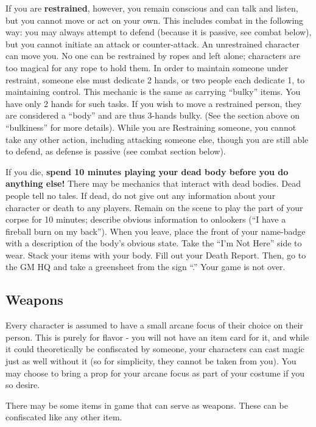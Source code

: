 \documentclass[sheet]{GL2020}
\begin{document}
If you are \textbf{restrained}, however, you remain conscious and can talk and listen, but you cannot move or act on your own. This includes combat in the following way: you may always attempt to defend (because it is passive, see combat below), but you cannot initiate an attack or counter-attack. An unrestrained character can move you. No one can be restrained by ropes and left alone; characters are too magical for any rope to hold them. In order to maintain someone under restraint, someone else must dedicate 2 hands, or two people each dedicate 1, to maintaining control. This mechanic is the same as carrying ``bulky'' items. You have only 2 hands for such tasks. If you wish to move a restrained person, they are considered a ``body'' and are thus 3-hands bulky. (See the section above on ``bulkiness'' for more details). While you are Restraining someone, you cannot take any other action, including attacking someone else, though you are still able to defend, as defense is passive (see combat section below).

If you die, \textbf{spend 10 minutes playing your dead body before you do anything else!} There may be mechanics that interact with dead bodies. Dead people tell no tales. If dead, do not give out any information about your character or death to any players. Remain on the scene to play the part of your corpse for 10 minutes; describe obvious information to onlookers (``I have a fireball burn on my back''). When you leave, place the front of your name-badge with a description of the body's obvious state. Take the ``I'm Not Here'' side to wear. Stack your items with your body. Fill out your Death Report. Then, go to the GM HQ and take a greensheet from the sign ``\sMurdered{}.'' Your game is not over. 

\subsection{Weapons}
Every character is assumed to have a small arcane focus of their choice on their person. This is purely for flavor - you will not have an item card for it, and while it could theoretically be confiscated by someone, your characters can cast magic just as well without it (so for simplicity, they cannot be taken from you). You may choose to bring a prop for your arcane focus as part of your costume if you so desire.

There may be some items in game that can serve as weapons. These can be confiscated like any other item.
\end{document}
